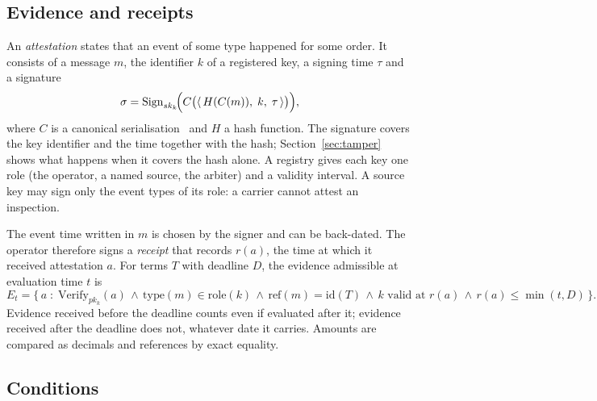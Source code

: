 \documentclass[10pt,a4paper]{article}
\theoremstyle{tight}
\begin{document}
\subsection{Evidence and receipts}

An \emph{attestation} states that an event of some type happened for some order. It consists of a message $m$, the
identifier $k$ of a registered key, a signing time $\tau$ and a signature
\begin{equation}\label{eq:att}
\sigma = \mathrm{Sign}_{sk_k}\!\Bigl(C\bigl(\langle\, H(C(m)),\; k,\; \tau \,\rangle\bigr)\Bigr),
\end{equation}
where $C$ is a canonical serialisation~\cite{rfc8785} and $H$ a hash function. The signature covers the key
identifier and the time together with the hash; Section~\ref{sec:tamper} shows what happens when it covers the hash
alone. A registry gives each key one role (the operator, a named source, the arbiter) and a validity interval. A
source key may sign only the event types of its role: a carrier cannot attest an inspection.

The event time written in $m$ is chosen by the signer and can be back-dated. The operator therefore signs a
\emph{receipt} that records $r(a)$, the time at which it received attestation $a$. For terms $T$ with deadline $D$,
the evidence admissible at evaluation time $t$ is
\begin{equation}\label{eq:adm}
E_t = \bigl\{\, a \;:\; \mathrm{Verify}_{pk_k}(a) \,\wedge\, \mathrm{type}(m) \in \mathrm{role}(k) \,\wedge\,
\mathrm{ref}(m) = \mathrm{id}(T) \,\wedge\, k \text{ valid at } r(a) \,\wedge\, r(a) \le \min(t, D) \,\bigr\}.
\end{equation}
Evidence received before the deadline counts even if evaluated after it; evidence received after the deadline does
not, whatever date it carries. Amounts are compared as decimals and references by exact equality.

\subsection{Conditions}
\end{document}

